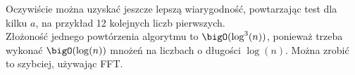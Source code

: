 Oczywiście można uzyskać jeszcze lepszą wiarygodność, powtarzając test dla kilku \( a \), na przykład 12 kolejnych liczb pierwszych. \\
Złożoność jednego powtórzenia algorytmu to \( \bigO(\log^3(n)) \), ponieważ trzeba wykonać \( \bigO(\log(n)) \) mnożeń na liczbach o długości \( \log(n) \). Można zrobić to szybciej, używając FFT.